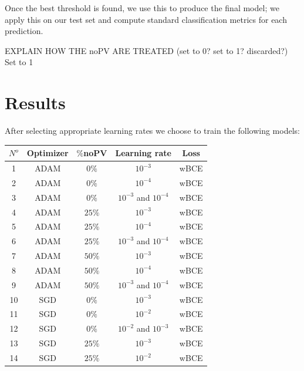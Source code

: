 \documentclass[10pt,conference]{IEEEtran}
\begin{document}
Once the best threshold is found, we use this to produce
the final model; we apply this on our test set and compute
standard classification metrics for each prediction.


EXPLAIN HOW THE noPV ARE TREATED (set to 0? set to 1? discarded?)
Set to 1 

\section{Results}
After selecting appropriate learning rates we choose to train the following models:

\begin{center}
    \begin{tabular}{||c | c  | c | c | c ||} 
        \hline
        $N^o$ & Optimizer & $\%$noPV & Learning rate & Loss \\ [0.5ex] 
        \hline\hline
        1 & ADAM & $0\% $ & $10^{-3}$ & wBCE \\
        \hline
        2 & ADAM & $0\% $ & $10^{-4}$ & wBCE \\
        \hline
        3 & ADAM & $0\% $ & $10^{-3}$ and $10^{-4}$ & wBCE \\
        \hline
        4 & ADAM & $25\% $ & $10^{-3}$  & wBCE \\
        \hline
        5 & ADAM & $25\% $ & $10^{-4}$ & wBCE \\
        \hline
        6 & ADAM & $25\% $ & $10^{-3}$ and $10^{-4}$ & wBCE \\
        \hline
        7 & ADAM & $50\% $ & $10^{-3}$ & wBCE \\
        \hline
        8 & ADAM & $50\% $ & $10^{-4}$ & wBCE \\
        \hline
        9 & ADAM & $50\% $ & $10^{-3}$ and $10^{-4}$ & wBCE \\
        \hline
        10 & SGD & $0\% $ & $10^{-3}$ & wBCE \\
        \hline
        11 & SGD & $0\% $ & $10^{-2}$ & wBCE \\
        \hline
        12 & SGD & $0\% $ & $10^{-2}$ and $10^{-3}$ & wBCE \\
        \hline
        13 & SGD & $25\% $ & $10^{-3}$ & wBCE \\
        \hline
        14 & SGD & $25\% $ & $10^{-2}$ & wBCE \\

\end{tabular}
\end{center}
\end{document}
